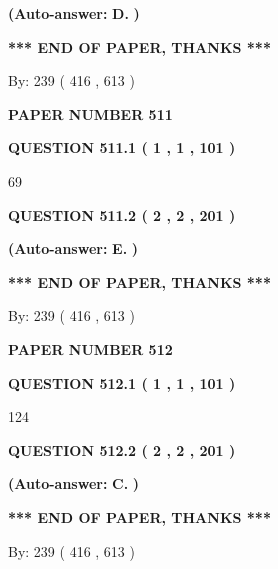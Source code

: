 \documentclass[12pt]{article}
\begin{document}
 
{\textbf{(Auto-answer:}}
{\textbf{\large{
D.}}}
{\textbf{)}}
 
 
   
   
   
   
\vspace{1.0in} 
{\textbf{\large{ *** END OF PAPER, THANKS *** }}} 
   
   
\hspace{1.0in} By: 
 239 ( 416 ,  613 )
   
   
   
   
\newpage 
\setcounter{page}{ 
   511001 } 
   
   
 {\textbf{ \Large{ PAPER NUMBER  511  }}}
   
   
   
   
  
  
{\textbf{\large{QUESTION
511.1 
 ( 1 , 1 , 101 )
}}}

69
  
  
{\textbf{\large{QUESTION
511.2 
 ( 2 , 2 , 201 )
}}}
 
 
{\textbf{(Auto-answer:}}
{\textbf{\large{
E.}}}
{\textbf{)}}
 
 
   
   
   
   
\vspace{1.0in} 
{\textbf{\large{ *** END OF PAPER, THANKS *** }}} 
   
   
\hspace{1.0in} By: 
 239 ( 416 ,  613 )
   
   
   
   
\newpage 
\setcounter{page}{ 
   512001 } 
   
   
 {\textbf{ \Large{ PAPER NUMBER  512  }}}
   
   
   
   
  
  
{\textbf{\large{QUESTION
512.1 
 ( 1 , 1 , 101 )
}}}

124
  
  
{\textbf{\large{QUESTION
512.2 
 ( 2 , 2 , 201 )
}}}
 
 
{\textbf{(Auto-answer:}}
{\textbf{\large{
C.}}}
{\textbf{)}}
 
 
   
   
   
   
\vspace{1.0in} 
{\textbf{\large{ *** END OF PAPER, THANKS *** }}} 
   
   
\hspace{1.0in} By: 
 239 ( 416 ,  613 )
   
   
   
\end{document}
